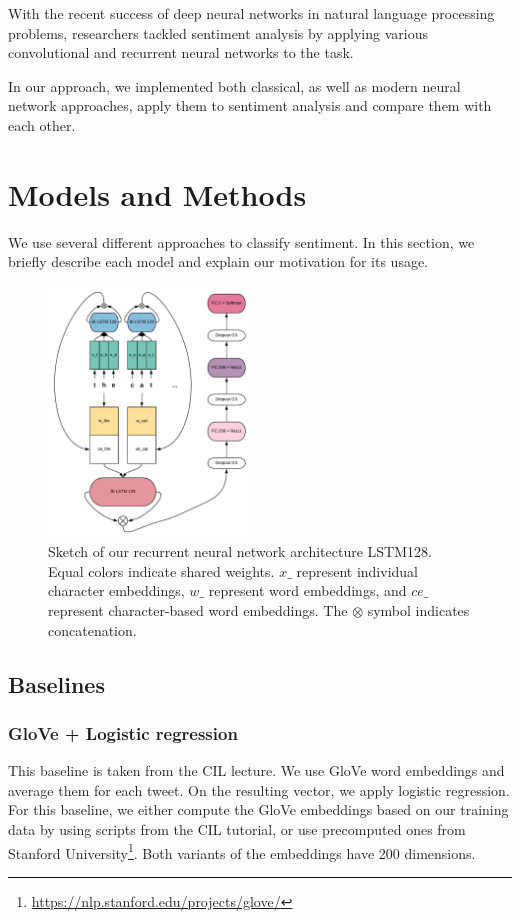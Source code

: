 \documentclass[10pt,conference,compsocconf]{IEEEtran}
\begin{document}
With the recent success of deep neural networks in natural language processing problems, researchers tackled sentiment analysis by applying various convolutional \cite{TextCNN} and recurrent neural networks \cite{rnn} to the task. 

In our approach, we implemented both classical, as well as modern neural network approaches, apply them to sentiment analysis and compare them with each other.

\section{Models and Methods}

We use several different approaches to classify sentiment. In this section, we briefly describe each model and explain our motivation for its usage.

\begin{figure}
\includegraphics[width=0.48\textwidth]{./rnn}
\caption{Sketch of our recurrent neural network architecture LSTM128. Equal colors indicate shared weights. $x\_$ represent individual character embeddings, $w\_$ represent word embeddings, and $ce\_$ represent character-based word embeddings.
The $\otimes$ symbol indicates concatenation.}
\label{fig:arch}
\end{figure}

\subsection{Baselines}

\subsubsection{GloVe + Logistic regression}
This baseline is taken from the CIL lecture. We use GloVe word embeddings \cite{pennington2014glove} and average them for each tweet. On the resulting vector, we apply logistic regression. For this baseline, we either compute the GloVe embeddings based on our training data by using scripts from the CIL tutorial, or use precomputed ones from Stanford University\footnote{\url{https://nlp.stanford.edu/projects/glove/}}.
Both variants of the embeddings have 200 dimensions.
\end{document}
